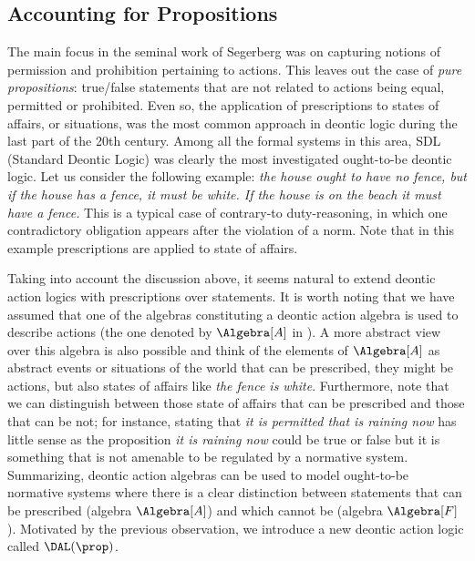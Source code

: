 \subsection{Accounting for Propositions}\label{sec:dal:propositions}

The main focus in the seminal work of Segerberg \cite{Segerberg1982} was on capturing notions of permission and prohibition pertaining to actions.
This leaves out the case of \emph{pure propositions}: true/false statements that are not related to actions being equal, permitted or prohibited.  Even so, the application of prescriptions to 
states of affairs, or situations, was the most common approach in deontic logic during the last part of the 20th century.  Among all the formal systems in this area, SDL (Standard Deontic Logic) \cite{Aqvist:2002} was clearly the most investigated ought-to-be deontic logic.  Let us consider the following example: \emph{the house ought to have no fence,  but if the house has a fence,  it must be white. If the house is on the beach it must have a fence.} \cite{Prakken:1996} This is a typical case of contrary-to duty-reasoning, in which one contradictory obligation appears after the violation of a norm. Note that in this example prescriptions are applied to state of affairs.  

Taking into account the discussion above,  it seems natural to extend deontic action logics with prescriptions over statements.  It is worth noting that we have assumed that one of the algebras constituting a deontic action algebra is used to describe actions (the one denoted by $\Algebra[A]$ in ).  A more abstract view over this algebra is also possible and think of the elements of  $\Algebra[A]$ as abstract events or situations of the world that can be prescribed,  they might be actions,  but also states of affairs like \emph{the fence is white}.  Furthermore,  note that we can distinguish between those state of affairs that can be prescribed and those that can be not; for instance,  stating that \emph{it is permitted that is raining now} has little sense as the proposition \emph{it is raining now} could be true or false but it is something that is not amenable to be regulated by a normative system.  Summarizing,  deontic action algebras can be used to model ought-to-be normative systems where there is a clear distinction between statements that can be prescribed (algebra $\Algebra[A]$) and which cannot be (algebra $\Algebra[F]$).
 Motivated by the previous observation, we introduce a new deontic action logic called $\DAL(\prop)$.

